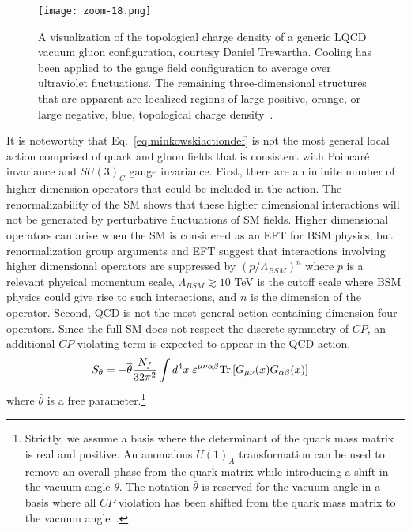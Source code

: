 \begin{figure}[ht!]
  \begin{center}
  \texttt{[image: zoom-18.png]}
  \end{center}
  \caption{
    A visualization of the topological charge density of a generic LQCD vacuum gluon configuration, courtesy Daniel Trewartha.
    Cooling has been applied to the gauge field configuration to average over ultraviolet fluctuations.
    The remaining three-dimensional structures that are apparent are localized regions of large positive, orange, or large negative, blue, topological charge density~\cite{Trewartha:2015ida}.}
  \label{fig:topcharge}
\end{figure}

It is noteworthy that Eq.~\eqref{eq:minkowskiactiondef} is not the most general local action comprised of quark and gluon fields that is consistent with Poincar{\'e} invariance and $SU(3)_C$ gauge invariance.
First, there are an infinite number of higher dimension operators that could be included in the action.
The renormalizability of the SM shows that these higher dimensional interactions will not be generated by perturbative fluctuations of SM fields.
Higher dimensional operators can arise when the SM is considered as an EFT for BSM physics, but
renormalization group arguments and EFT suggest that interactions involving higher dimensional operators are suppressed by $(p/\Lambda_{BSM})^n$ where $p$ is a relevant physical momentum scale, $\Lambda_{BSM} \gtrsim 10$ TeV is the cutoff scale where BSM physics could give rise to such interactions, and $n$ is the dimension of the operator.
Second, QCD is not the most general action containing dimension four operators.
Since the full SM does not respect the discrete symmetry of $CP$, an additional $CP$ violating term is expected to appear in the QCD action,
\begin{equation}
  \begin{split}
    S_{\theta} &= -  \overline{\theta}  \frac{N_f}{32\pi^2} \int d^4 x\; \varepsilon^{\mu\nu\alpha\beta}\text{Tr}\left[ G_{\mu\nu}(x)G_{\alpha\beta}(x) \right]
  \end{split}\label{eq:thetaactiondef}
\end{equation}
where $\bar{\theta}$ is a free parameter.\footnote{Strictly, we assume a basis where the determinant of the quark mass matrix is real and positive. An anomalous $U(1)_A$ transformation can be used to remove an overall phase from the quark matrix while introducing a shift in the vacuum angle $\theta$. The notation $\bar{\theta}$ is reserved for the vacuum angle in a basis where all $CP$ violation has been shifted from the quark mass matrix to the vacuum angle~\cite{coleman:1988aspects}.}
